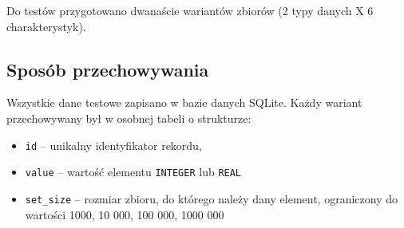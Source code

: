 

Do testów przygotowano dwanaście wariantów zbiorów (2 typy danych X 6 charakterystyk).

\subsection{Sposób przechowywania}

Wszystkie dane testowe zapisano w bazie danych SQLite. Każdy wariant przechowywany był w osobnej tabeli o strukturze:

\begin{itemize}
    \item \texttt{id} -- unikalny identyfikator rekordu,
    \item \texttt{value} -- wartość elementu \texttt{INTEGER} lub \texttt{REAL}
    \item \texttt{set\_size} -- rozmiar zbioru, do którego należy dany element, ograniczony do wartości 1000, 10 000, 100 000, 1000 000
\end{itemize}
